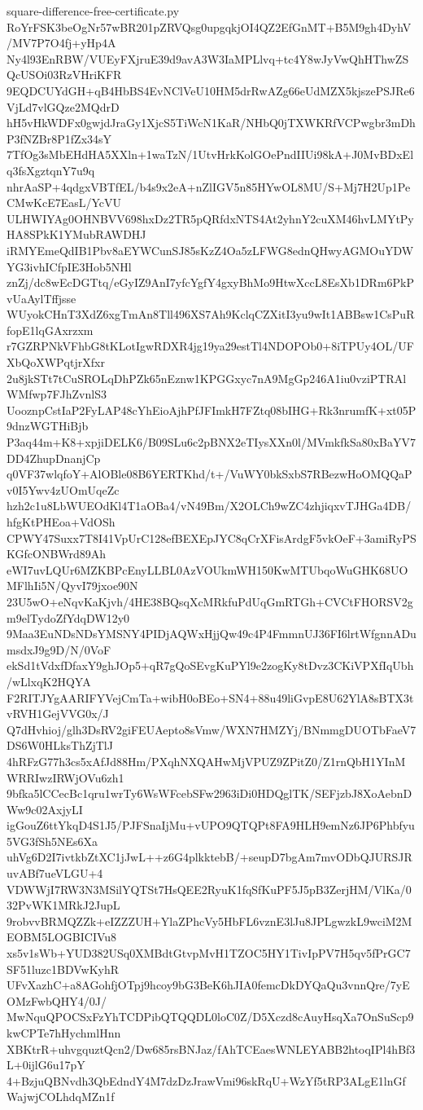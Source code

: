 \documentclass[11pt]{article}
\theoremstyle{definition}
\theoremstyle{remark}
\begin{document}
\begin{filecontents*}[overwrite]{square-difference-free-certificate.py}
RoYrFSK3beOgNr57wBR201pZRVQsg0upgqkjOI4QZ2EfGnMT+B5M9gh4DyhV/MV7P7O4fj+yHp4A
Ny4l93EnRBW/VUEyFXjruE39d9avA3W3IaMPLlvq+tc4Y8wJyVwQhHThwZSQcUSOi03RzVHriKFR
9EQDCUYdGH+qB4HbBS4EvNClVeU10HM5drRwAZg66eUdMZX5kjszePSJRe6VjLd7vlGQze2MQdrD
hH5vHkWDFx0gwjdJraGy1XjcS5TiWcN1KaR/NHbQ0jTXWKRfVCPwgbr3mDhP3fNZBr8P1fZx34sY
7TfOg3sMbEHdHA5XXln+1waTzN/1UtvHrkKolGOePndIIUi98kA+J0MvBDxElq3fsXgztqnY7u9q
nhrAaSP+4qdgxVBTfEL/b4s9x2eA+nZlIGV5n85HYwOL8MU/S+Mj7H2Up1PeCMwKcE7EasL/YcVU
ULHWIYAg0OHNBVV698hxDz2TR5pQRfdxNTS4At2yhnY2cuXM46hvLMYtPyHA8SPkK1YMubRAWDHJ
iRMYEmeQdIB1Pbv8aEYWCunSJ85sKzZ4Oa5zLFWG8ednQHwyAGMOuYDWYG3ivhICfpIE3Hob5NHl
znZj/dc8wEcDGTtq/eGyIZ9AnI7yfcYgfY4gxyBhMo9HtwXccL8EsXb1DRm6PkPvUaAylTffjsse
WUyokCHnT3XdZ6xgTmAn8Tll496XS7Ah9KclqCZXitI3yu9wIt1ABBsw1CsPuRfopE1lqGAxrzxm
r7GZRPNkVFhbG8tKLotIgwRDXR4jg19ya29estTl4NDOPOb0+8iTPUy4OL/UFXbQoXWPqtjrXfxr
2u8jkSTt7tCuSROLqDhPZk65nEznw1KPGGxyc7nA9MgGp246A1iu0vziPTRAlWMfwp7FJhZvnlS3
UooznpCstIaP2FyLAP48cYhEioAjhPfJFImkH7FZtq08bIHG+Rk3nrumfK+xt05P9dnzWGTHiBjb
P3aq44m+K8+xpjiDELK6/B09SLu6c2pBNX2eTIysXXn0l/MVmkfkSa80xBaYV7DD4ZhupDnanjCp
q0VF37wlqfoY+AlOBle08B6YERTKhd/t+/VuWY0bkSxbS7RBezwHoOMQQaPv0I5Ywv4zUOmUqeZc
hzh2c1u8LbWUEOdKl4T1aOBa4/vN49Bm/X2OLCh9wZC4zhjiqxvTJHGa4DB/hfgKtPHEoa+VdOSh
CPWY47Suxx7T8I41VpUrC128efBEXEpJYC8qCrXFisArdgF5vkOeF+3amiRyPSKGfcONBWrd89Ah
eWI7uvLQUr6MZKBPcEnyLLBL0AzVOUkmWH150KwMTUbqoWuGHK68UOMFlhIi5N/QyvI79jxoe90N
23U5wO+eNqvKaKjvh/4HE38BQsqXcMRkfuPdUqGmRTGh+CVCtFHORSV2gm9elTydoZfYdqDW12y0
9Maa3EuNDsNDsYMSNY4PIDjAQWxHjjQw49c4P4FmmnUJ36FI6lrtWfgnnADumsdxJ9g9D/N/0VoF
ekSd1tVdxfDfaxY9ghJOp5+qR7gQoSEvgKuPYl9e2zogKy8tDvz3CKiVPXfIqUbh/wLlxqK2HQYA
F2RITJYgAARIFYVejCmTa+wibH0oBEo+SN4+88u49liGvpE8U62YlA8sBTX3tvRVH1GejVVG0x/J
Q7dHvhioj/glh3DsRV2giFEUAepto8sVmw/WXN7HMZYj/BNmmgDUOTbFaeV7DS6W0HLksThZjTlJ
4hRFzG77h3cs5xAfJd88Hm/PXqhNXQAHwMjVPUZ9ZPitZ0/Z1rnQbH1YInMWRRIwzIRWjOVu6zh1
9bfka5lCCecBc1qru1wrTy6WsWFcebSFw2963iDi0HDQglTK/SEFjzbJ8XoAebnDWw9c02AxjyLI
igGouZ6ttYkqD4S1J5/PJFSnaIjMu+vUPO9QTQPt8FA9HLH9emNz6JP6Phbfyu5VG3fSh5NEs6Xa
uhVg6D2I7ivtkbZtXC1jJwL++z6G4plkktebB/+seupD7bgAm7mvODbQJURSJRuvABf7ueVLGU+4
VDWWjI7RW3N3MSilYQTSt7HsQEE2RyuK1fqSfKuPF5J5pB3ZerjHM/VlKa/032PvWK1MRkJ2JupL
9robvvBRMQZZk+eIZZZUH+YlaZPhcVy5HbFL6vznE3lJu8JPLgwzkL9wciM2MEOBM5LOGBICIVu8
xs5v1sWb+YUD382USq0XMBdtGtvpMvH1TZOC5HY1TivIpPV7H5qv5fPrGC7SF51luzc1BDVwKyhR
UFvXazhC+a8AGohfjOTpj9hcoy9bG3BeK6hJIA0femcDkDYQaQu3vnnQre/7yEOMzFwbQHY4/0J/
MwNquQPOCSxFzYhTCDPibQTQQDL0loC0Z/D5Xczd8cAuyHsqXa7OnSuScp9kwCPTe7hHychmlHnn
XBKtrR+uhvgquztQcn2/Dw685rsBNJaz/fAhTCEaesWNLEYABB2htoqIPl4hBf3L+0ijlG6u17pY
4+BzjuQBNvdh3QbEdndY4M7dzDzJrawVmi96skRqU+WzYf5tRP3ALgE1lnGfWajwjCOLhdqMZn1f

\end{filecontents*}
\end{document}
